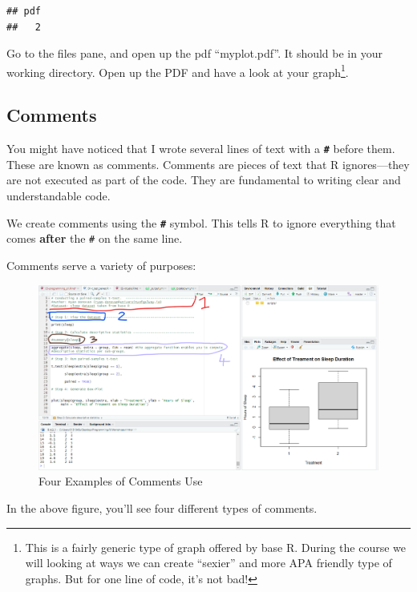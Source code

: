 \documentclass[
]{book}
\begin{document}
\begin{verbatim}
## pdf 
##   2
\end{verbatim}

Go to the files pane, and open up the pdf ``myplot.pdf''. It should be in your working directory. Open up the PDF and have a look at your graph\footnote{This is a fairly generic type of graph offered by base R. During the course we will looking at ways we can create ``sexier'' and more APA friendly type of graphs. But for one line of code, it's not bad!}.

\subsection{Comments}\label{comments}

You might have noticed that I wrote several lines of text with a \textbf{\texttt{\#}} before them. These are known as comments. Comments are pieces of text that R ignores---they are not executed as part of the code. They are fundamental to writing clear and understandable code.

We create comments using the \textbf{\texttt{\#}} symbol. This tells R to ignore everything that comes \textbf{after} the \texttt{\#} on the same line.

Comments serve a variety of purposes:

\begin{figure}
\centering
\includegraphics{img/03-comments.png}
\caption{\label{fig:unnamed-chunk-27}Four Examples of Comments Use}
\end{figure}

In the above figure, you'll see four different types of comments.
\end{document}
